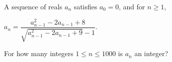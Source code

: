 A sequence of reals $a_n$ satisfies $a_0 = 0$, and for $n \ge 1$,

$a_n =
\dfrac{a^2_{n-1}-2a_{n-1} + 8}{
\sqrt{a^2_{n-1}-2a_{n-1} + 9}-1}.$

For how many integers $1 \le n \le 1000$ is $a_n$ an integer?

